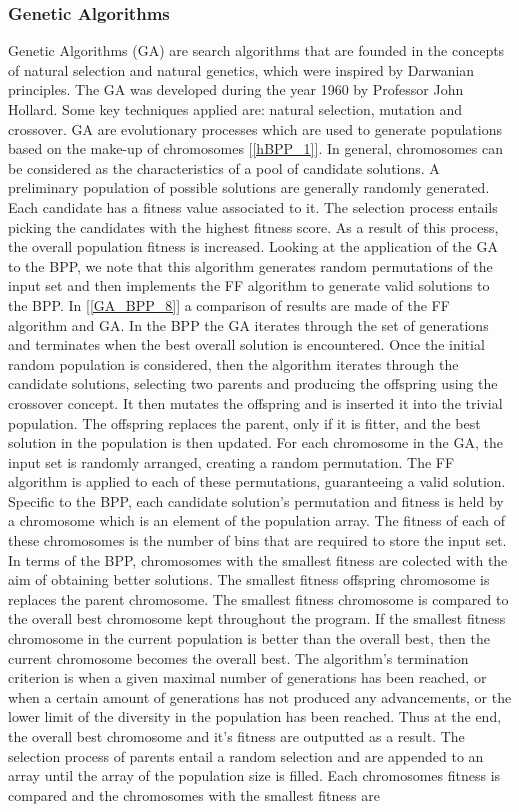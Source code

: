 \subsubsection{Genetic Algorithms}
\begin{flushleft}
Genetic Algorithms (GA) are search algorithms that are founded in the concepts of natural selection and natural genetics, which were inspired by Darwanian principles. The GA was developed during the year 1960 by Professor John Hollard. Some key techniques applied are: natural selection, mutation and crossover. GA are evolutionary processes which are used to generate populations based on the make-up of chromosomes [\ref{hBPP_1}]. In general, chromosomes can be considered as the characteristics of a pool of candidate solutions. A preliminary population of possible solutions are generally randomly generated. Each candidate has a fitness value associated to it. The selection process entails picking the candidates with the highest fitness score. As a result of this process, the overall population fitness is increased.  Looking at the application of the GA to the BPP, we note that this algorithm generates random permutations of the input set and then implements the FF algorithm to generate valid solutions to the BPP.  In [\ref{GA_BPP_8}] a comparison of results are made of the FF algorithm and GA. In the BPP the GA iterates through the set of generations and terminates when the best overall solution is encountered. Once the initial random population is considered, then the algorithm iterates through the candidate solutions, selecting two parents and producing the offspring using the crossover concept. It then mutates the offspring and is inserted it into the trivial population. The offspring replaces the parent, only if it is fitter,  and the best solution in the population is then updated. For each chromosome in the GA, the input set is randomly arranged, creating a random permutation. The FF algorithm is applied to each of these permutations, guaranteeing a valid solution. Specific to the BPP, each candidate solution's permutation and fitness is held by a chromosome which is an element of the population array. The fitness of each of these chromosomes is the number of bins that are required to store the input set. In terms of the BPP,  chromosomes with the smallest fitness are colected with the aim of obtaining better solutions. The smallest fitness offspring chromosome is replaces the parent chromosome. The smallest fitness chromosome is  compared to the overall best chromosome kept throughout the program. If the smallest fitness chromosome in the current population is better than the overall best, then the current chromosome becomes the overall best. The algorithm's termination criterion is when a given maximal number of generations has been reached, or when a certain amount of generations has not produced any advancements, or the lower limit of the diversity in the population has been reached. Thus at the end, the overall best chromosome and it's fitness are outputted as a result. The selection process of parents entail a random selection and are appended to an array until the array of the population size is filled. Each chromosomes fitness is compared and the chromosomes with the smallest fitness are 
\end{flushleft}
